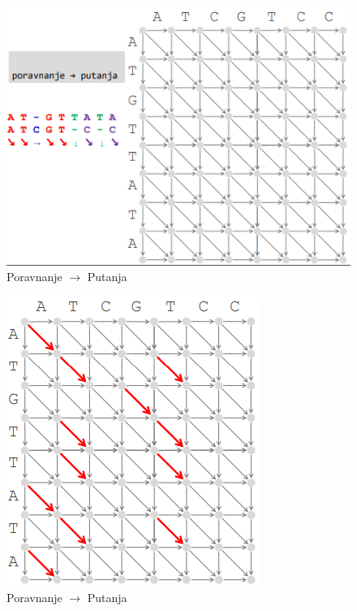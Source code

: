 \begin{minipage}{\textwidth}
	\centering
	\begin{minipage}{0.45\textwidth}
		\begin{figure}[H]
			\centering
			\includegraphics[width=\textwidth]{poglavlja/5/slike/menhetn4.png}
			\caption{Poravnanje $\rightarrow$ Putanja}
			\label{slika:menhetn4}
		\end{figure}  
	\end{minipage}
	\hfill 
	\begin{minipage}{0.45\textwidth}
		\begin{figure}[H]
			\centering
			\includegraphics[width=\textwidth]{poglavlja/5/slike/poravnanje1.png}
			\caption{Poravnanje $\rightarrow$ Putanja}
			\label{slika:poravnanje2}
		\end{figure} 
	\end{minipage}
	\vspace*{1em}
\end{minipage}
